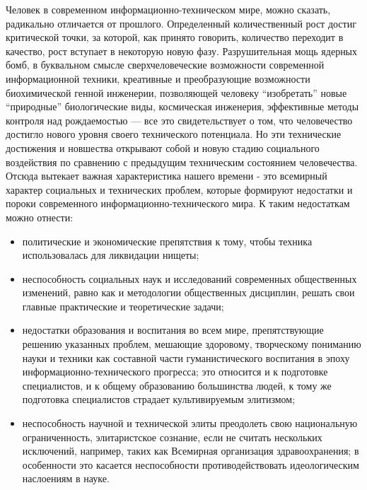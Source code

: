 Человек в современном информационно-техническом мире, можно сказать, радикально отличается от прошлого. Определенный количественный рост достиг критической точки, за которой, как принято говорить, количество переходит в качество, рост вступает в некоторую новую фазу. Разрушительная мощь ядерных бомб, в буквальном смысле сверхчеловеческие возможности современной информационной техники, креативные и преобразующие возможности биохимической генной инженерии, позволяющей человеку ``изобретать'' новые ``природные'' биологические виды, космическая инженерия, эффективные методы контроля над рождаемостью — все это свидетельствует о том, что человечество достигло нового уровня своего технического потенциала. Но эти технические достижения и новшества открывают собой и новую стадию социального воздействия по сравнению с предыдущим техническим состоянием человечества. Отсюда вытекает важная характеристика нашего времени - это всемирный характер социальных и технических проблем, которые формируют недостатки и пороки современного информационно-технического мира. К таким недостаткам можно отнести:

\begin{itemize}

\item{политические и экономические препятствия к тому, чтобы техника использовалась для ликвидации нищеты;}
  
\item{неспособность социальных наук и исследований современных общественных изменений, равно как и методологии общественных дисциплин, решать свои главные практические и теоретические задачи;}
  
\item{недостатки образования и воспитания во всем мире, препятствующие решению указанных проблем, мешающие здоровому, творческому пониманию науки и техники как составной части гуманистического воспитания в эпоху информационно-технического прогресса; это относится и к подготовке специалистов, и к общему образованию большинства людей, к тому же подготовка специалистов страдает культивируемым элитизмом;}
  
\item{неспособность научной и технической элиты преодолеть свою национальную ограниченность, элитаристское сознание, если не считать нескольких исключений, например, таких как Всемирная организация здравоохранения; в особенности это касается неспособности противодействовать идеологическим наслоениям в науке.}
\end{itemize}

